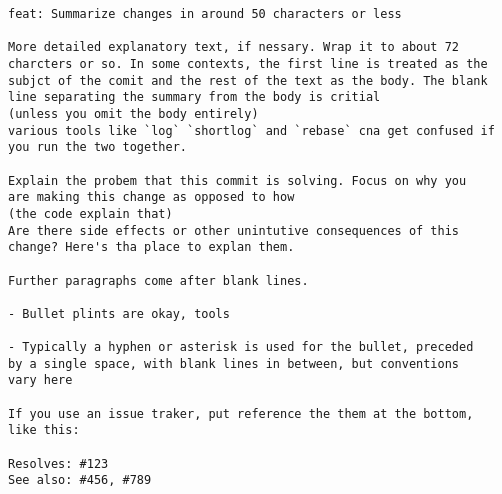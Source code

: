 \documentclass[11pt]{article}
\begin{document}
\begin{verbatim}
feat: Summarize changes in around 50 characters or less

More detailed explanatory text, if nessary. Wrap it to about 72
charcters or so. In some contexts, the first line is treated as the
subjct of the comit and the rest of the text as the body. The blank
line separating the summary from the body is critial
(unless you omit the body entirely)
various tools like `log` `shortlog` and `rebase` cna get confused if
you run the two together.

Explain the probem that this commit is solving. Focus on why you
are making this change as opposed to how
(the code explain that)
Are there side effects or other unintutive consequences of this
change? Here's tha place to explan them.

Further paragraphs come after blank lines.

- Bullet plints are okay, tools

- Typically a hyphen or asterisk is used for the bullet, preceded
by a single space, with blank lines in between, but conventions
vary here

If you use an issue traker, put reference the them at the bottom,
like this:

Resolves: #123
See also: #456, #789

\end{verbatim}
\end{document}
